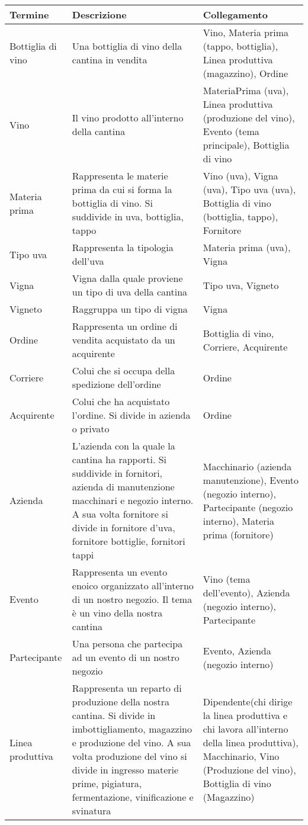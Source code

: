 \begin{center}
	\begin{tabular}{P{2cm}P{8cm}P{4cm}}
		\toprule
		 Termine & Descrizione & Collegamento \\
		\midrule
		Bottiglia di vino & Una bottiglia di vino della cantina in vendita & Vino, Materia prima (tappo, bottiglia), Linea produttiva (magazzino), Ordine\\
		\midrule
		Vino & Il vino prodotto all'interno della cantina & MateriaPrima (uva), Linea produttiva (produzione del vino), Evento (tema principale), Bottiglia di vino \\
		\midrule
		Materia prima & Rappresenta le materie prima da cui si forma la bottiglia di vino. Si suddivide in uva, bottiglia, tappo  &  Vino (uva), Vigna (uva), Tipo uva (uva), Bottiglia di vino (bottiglia, tappo), Fornitore\\
		\midrule
		Tipo uva & Rappresenta la tipologia dell'uva &  Materia prima (uva), Vigna\\
		\midrule
		Vigna & Vigna dalla quale proviene un tipo di uva della cantina &  Tipo uva, Vigneto\\
		\midrule
		Vigneto & Raggruppa un tipo di vigna &  Vigna\\
		\midrule
		Ordine & Rappresenta un ordine di vendita acquistato da un acquirente &  Bottiglia di vino, Corriere, Acquirente\\
		\midrule
		Corriere & Colui che si occupa della spedizione dell'ordine &  Ordine\\
		\midrule
		Acquirente & Colui che ha acquistato l'ordine. Si divide in azienda o privato &  Ordine\\
		\midrule
		Azienda & L'azienda con la quale la cantina ha rapporti. Si suddivide in fornitori, azienda di manutenzione macchinari e negozio interno. A sua volta fornitore si divide in fornitore d'uva, fornitore bottiglie, fornitori tappi &  Macchinario (azienda manutenzione), Evento (negozio interno), Partecipante (negozio interno), Materia prima (fornitore)\\
		\midrule
		Evento & Rappresenta un evento enoico organizzato all'interno di un nostro negozio. Il tema è un vino della nostra cantina  &  Vino (tema dell'evento), Azienda (negozio interno), Partecipante\\
		\midrule
		Partecipante & Una persona che partecipa ad un evento di un nostro negozio &  Evento, Azienda (negozio interno)\\
		\midrule
		Linea produttiva & Rappresenta un reparto di produzione della nostra cantina. Si divide in imbottigliamento, magazzino e produzione del vino. A sua volta produzione del vino si divide in ingresso materie prime, pigiatura, fermentazione, vinificazione e svinatura &  Dipendente(chi dirige la linea produttiva e chi lavora all'interno della linea produttiva), Macchinario, Vino (Produzione del vino), Bottiglia di vino (Magazzino)\\

\end{tabular}
\end{center}
